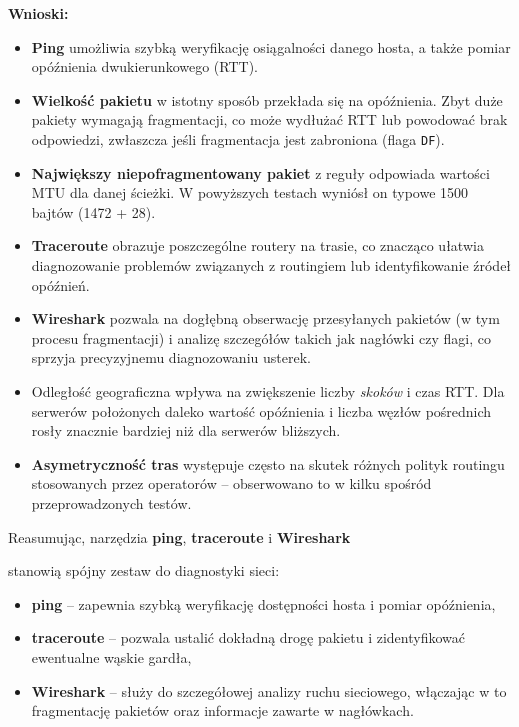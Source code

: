 \documentclass[12pt]{article}
\begin{document}
\vspace{1\baselineskip}
\textbf{Wnioski: }
\begin{itemize}
  \item \textbf{Ping} umożliwia szybką weryfikację osiągalności danego hosta, a także pomiar opóźnienia dwukierunkowego (RTT).
  \item \textbf{Wielkość pakietu} w istotny sposób przekłada się na opóźnienia. Zbyt duże pakiety wymagają fragmentacji, co może wydłużać RTT lub powodować brak odpowiedzi, zwłaszcza jeśli fragmentacja jest zabroniona (flaga \texttt{DF}).
  \item \textbf{Największy niepofragmentowany pakiet} z reguły odpowiada wartości MTU dla danej ścieżki. W powyższych testach wyniósł on typowe 1500 bajtów (1472 + 28).
  \item \textbf{Traceroute} obrazuje poszczególne routery na trasie, co znacząco ułatwia diagnozowanie problemów związanych z routingiem lub identyfikowanie źródeł opóźnień.
  \item \textbf{Wireshark} pozwala na dogłębną obserwację przesyłanych pakietów (w tym procesu fragmentacji) i analizę szczegółów takich jak nagłówki czy flagi, co sprzyja precyzyjnemu diagnozowaniu usterek.
  \item Odległość geograficzna wpływa na zwiększenie liczby \textit{skoków} i czas RTT. Dla serwerów położonych daleko wartość opóźnienia i liczba węzłów pośrednich rosły znacznie bardziej niż dla serwerów bliższych.
  \item \textbf{Asymetryczność tras} występuje często na skutek różnych polityk routingu stosowanych przez operatorów – obserwowano to w kilku spośród przeprowadzonych testów.
\end{itemize}

Reasumując, narzędzia \textbf{ping}, \textbf{traceroute} i \textbf{Wireshark} \par stanowią spójny zestaw do diagnostyki sieci:
\begin{itemize}
  \item \textbf{ping} – zapewnia szybką weryfikację dostępności hosta i pomiar opóźnienia,
  \item \textbf{traceroute} – pozwala ustalić dokładną drogę pakietu i zidentyfikować ewentualne wąskie gardła,
  \item \textbf{Wireshark} – służy do szczegółowej analizy ruchu sieciowego, włączając w to fragmentację pakietów oraz informacje zawarte w nagłówkach.
\end{itemize}
\end{document}
